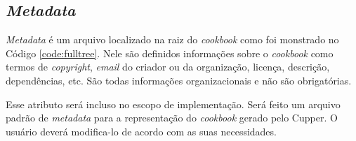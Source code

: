 
\subsection{\textit{Metadata}}
\label{sec:cbmetadata}

\textit{Metadata} é um arquivo localizado na raiz do \textit{cookbook} como foi monstrado no Código
\ref{code:fulltree}. Nele são definidos informações sobre o \textit{cookbook} como termos de \textit{copyright},
\textit{email} do criador ou da organização, licença, descrição, dependências, etc. São 
todas informações organizacionais e não são obrigatórias.

Esse atributo será incluso no escopo de implementação. Será feito um arquivo padrão de
\textit{metadata} para a representação do \textit{cookbook} gerado pelo Cupper. O usuário deverá
modifica-lo de acordo com as suas necessidades.
